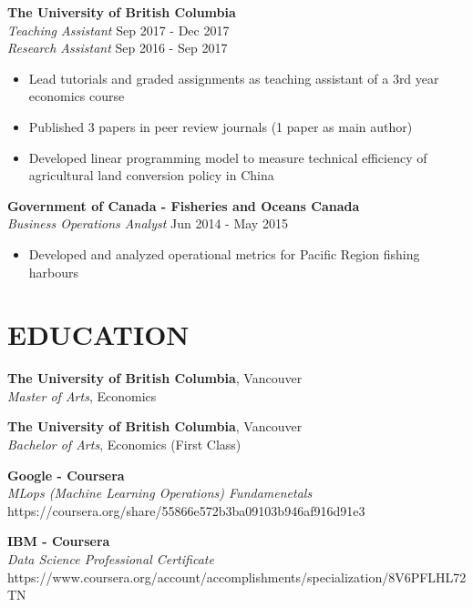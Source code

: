 \documentclass[margin]{res}
\begin{document}
\begin{resume}
\textbf{The University of British Columbia} 
    \\ {\sl Teaching Assistant } \hfill{Sep 2017 - Dec 2017}
    \\ {\sl Research Assistant } \hfill{Sep 2016 - Sep 2017}

\begin{itemize}
  \item Lead tutorials and graded assignments as teaching assistant of a 3rd year economics course
  \item Published 3 papers in peer review journals (1 paper as main author)
  \item Developed linear programming model to measure technical efficiency of agricultural land conversion policy in China
\end{itemize}

\textbf{Government of Canada - Fisheries and Oceans Canada} 
    \\ {\sl Business Operations Analyst } \hfill{Jun 2014 - May 2015}

\begin{itemize}
  \item Developed and analyzed operational metrics for Pacific Region fishing harbours 
\end{itemize}


\section{EDUCATION}
\textbf{The University of British Columbia}, Vancouver\\
{\sl Master of Arts}, Economics

\textbf{The University of British Columbia}, Vancouver\\
{\sl Bachelor of Arts}, Economics (First Class)

\textbf{Google - Coursera}\\
{\sl MLops (Machine Learning Operations) Fundamenetals} \\ 
https://coursera.org/share/55866e572b3ba09103b946af916d91e3

\textbf{IBM - Coursera}\\
{\sl Data Science Professional Certificate} \\ 
https://www.coursera.org/account/accomplishments/specialization/8V6PFLHL72TN


\end{resume}
\end{document}
